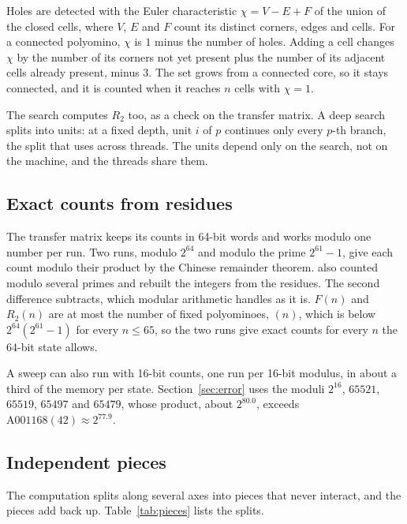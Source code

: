 \documentclass[11pt]{a000104}
\numberwithin{equation}{section}
\begin{document}
Holes are detected with the Euler characteristic $\chi = V - E + F$ of the union of the closed cells, where $V$, $E$ and $F$ count its distinct corners, edges and cells.
For a connected polyomino, $\chi$ is $1$ minus the number of holes.
Adding a cell changes $\chi$ by the number of its corners not yet present plus the number of its adjacent cells already present, minus $3$.
The set grows from a connected core, so it stays connected, and it is counted when it reaches $n$ cells with $\chi = 1$.

The search computes $R_2$ too, as a check on the transfer matrix.
A deep search splits into units: at a fixed depth, unit $i$ of $p$ continues only every $p$-th branch, the split that \textcite[Sect.~2.4.2]{Shirakawa:2025} uses across threads.
The units depend only on the search, not on the machine, and the threads share them.

\subsection{Exact counts from residues}\label{sec:crt}

The transfer matrix keeps its counts in 64-bit words and works modulo one number per run.
Two runs, modulo $2^{64}$ and modulo the prime $2^{61} - 1$, give each count modulo their product by the Chinese remainder theorem.
\textcite[3720]{Enting:1980} also counted modulo several primes and rebuilt the integers from the residues.
The second difference subtracts, which modular arithmetic handles as it is.
$F(n)$ and $R_2(n)$ are at most the number of fixed polyominoes, $(n)$, which is below $2^{64}(2^{61} - 1)$ for every $n \le 65$, so the two runs give exact counts for every $n$ the 64-bit state allows.

A sweep can also run with 16-bit counts, one run per 16-bit modulus, in about a third of the memory per state.
Section~\ref{sec:error} uses the moduli $2^{16}$, $65521$, $65519$, $65497$ and $65479$, whose product, about $2^{80.0}$, exceeds $\text{A001168}(42) \approx 2^{77.9}$.

\subsection{Independent pieces}\label{sec:pieces}

The computation splits along several axes into pieces that never interact, and the pieces add back up.
Table~\ref{tab:pieces} lists the splits.
\end{document}
